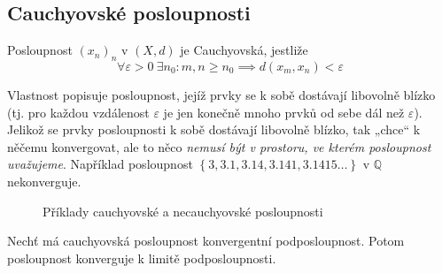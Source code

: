 \documentclass[../main.tex]{subfiles}
\begin{document}
\subsection{Cauchyovské posloupnosti}

\begin{definition}
	Posloupnost $(x_n)_n$ v $(X,d)$ je Cauchyovská, jestliže
	\[ \forall \varepsilon > 0\ \exists n_0: m,n \geq n_0 \implies d(x_m, x_n) < \varepsilon \]
\end{definition}

\begin{intuition}
	Vlastnost popisuje posloupnost, jejíž prvky se k sobě dostávají libovolně blízko (tj. pro každou vzdálenost $\varepsilon$ je jen konečně mnoho prvků od sebe dál než $\varepsilon$).
	Jelikož se prvky posloupnosti k sobě dostávají libovolně blízko, tak „chce“ k něčemu konvergovat, ale to něco \textit{nemusí být v prostoru, ve kterém posloupnost uvažujeme}. 
	Například posloupnost \(\left\{3, 3.1, 3.14, 3.141, 3.1415 \ldots\right\}\) v \(\mathbb{Q}\) nekonverguje.
\end{intuition}

\begin{figure}[h]
	\centering
	\hspace{5em}
	\caption{Příklady cauchyovské a necauchyovské posloupnosti}%
\end{figure}

\begin{lemma}
	Nechť má cauchyovská posloupnost konvergentní podposloupnost. Potom posloupnost konverguje k limitě
	podposloupnosti.
\end{lemma}
\end{document}
